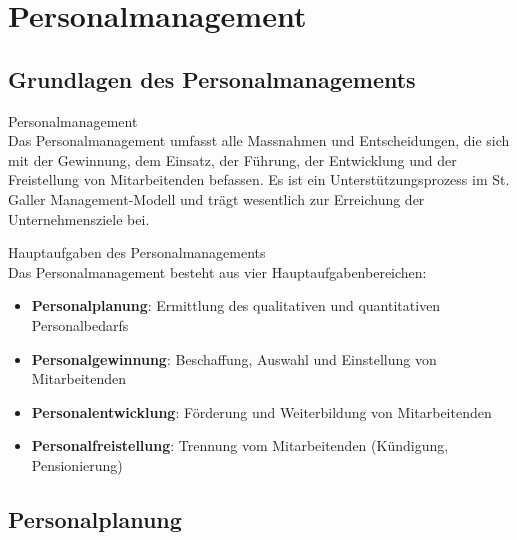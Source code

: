 \section{Personalmanagement}

\subsection{Grundlagen des Personalmanagements}

\begin{definition}{Personalmanagement}\\
Das Personalmanagement umfasst alle Massnahmen und Entscheidungen, die sich mit der Gewinnung, dem Einsatz, der Führung, der Entwicklung und der Freistellung von Mitarbeitenden befassen. Es ist ein Unterstützungsprozess im St. Galler Management-Modell und trägt wesentlich zur Erreichung der Unternehmensziele bei.
\end{definition}

\begin{concept}{Hauptaufgaben des Personalmanagements}\\
Das Personalmanagement besteht aus vier Hauptaufgabenbereichen:
\begin{itemize}
    \item \textbf{Personalplanung}: Ermittlung des qualitativen und quantitativen Personalbedarfs
    \item \textbf{Personalgewinnung}: Beschaffung, Auswahl und Einstellung von Mitarbeitenden
    \item \textbf{Personalentwicklung}: Förderung und Weiterbildung von Mitarbeitenden
    \item \textbf{Personalfreistellung}: Trennung vom Mitarbeitenden (Kündigung, Pensionierung)
\end{itemize}
\end{concept}

\subsection{Personalplanung}

